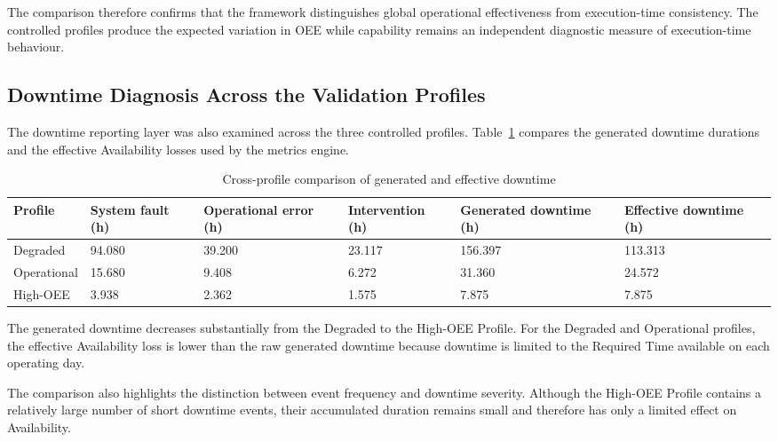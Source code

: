 The comparison therefore confirms that the framework distinguishes global operational
effectiveness from execution-time consistency. The controlled profiles produce the expected
variation in OEE while capability remains an independent diagnostic measure of execution-time
behaviour.
\subsection{Downtime Diagnosis Across the Validation Profiles}
\label{subsec:downtime-diagnosis-validation}

The downtime reporting layer was also examined across the three controlled profiles.
Table~\ref{tab:cross-profile-downtime-comparison} compares the generated downtime durations
and the effective Availability losses used by the metrics engine.

\begin{table}[htbp]
\small
\renewcommand{\arraystretch}{1.15}
\centering
\caption{Cross-profile comparison of generated and effective downtime}
\label{tab:cross-profile-downtime-comparison}
\begin{adjustbox}{max width=\textwidth}
\begin{tabular}{|p{2.7cm}|p{2.2cm}|p{2.5cm}|p{2.2cm}|p{2.4cm}|p{2.5cm}|}
\hline
\textbf{Profile} &
\textbf{System fault (h)} &
\textbf{Operational error (h)} &
\textbf{Intervention (h)} &
\textbf{Generated downtime (h)} &
\textbf{Effective downtime (h)} \\
\hline
Degraded &
94.080 &
39.200 &
23.117 &
156.397 &
113.313 \\
\hline
Operational &
15.680 &
9.408 &
6.272 &
31.360 &
24.572 \\
\hline
High-OEE &
3.938 &
2.362 &
1.575 &
7.875 &
7.875 \\
\hline
\end{tabular}
\end{adjustbox}
\end{table}

The generated downtime decreases substantially from the Degraded to the High-OEE Profile.
For the Degraded and Operational profiles, the effective Availability loss is lower than the raw
generated downtime because downtime is limited to the Required Time available on each
operating day.

The comparison also highlights the distinction between event frequency and downtime severity.
Although the High-OEE Profile contains a relatively large number of short downtime events,
their accumulated duration remains small and therefore has only a limited effect on Availability.

